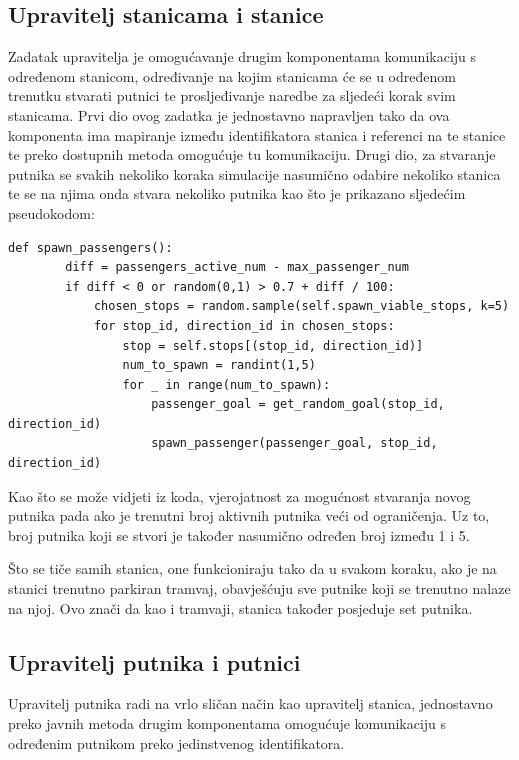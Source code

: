 \documentclass[times, utf8, diplomski]{fer}
\begin{document}
\subsection{Upravitelj stanicama i stanice}
Zadatak upravitelja je omogućavanje drugim komponentama komunikaciju s određenom stanicom, određivanje na kojim stanicama će se u određenom trenutku stvarati putnici te prosljeđivanje naredbe za sljedeći korak svim stanicama. Prvi dio ovog zadatka je jednostavno napravljen tako da ova komponenta ima mapiranje između identifikatora stanica i referenci na te stanice te preko dostupnih metoda omogućuje tu komunikaciju. Drugi dio, za stvaranje putnika se svakih nekoliko koraka simulacije nasumično odabire nekoliko stanica te se na njima onda stvara nekoliko putnika kao što je prikazano sljedećim pseudokodom:

\begin{lstlisting}[caption={Stvaranje novih putnika},captionpos=b,label={kod:passenger_spawn}]
    def spawn_passengers():
        diff = passengers_active_num - max_passenger_num
        if diff < 0 or random(0,1) > 0.7 + diff / 100:
            chosen_stops = random.sample(self.spawn_viable_stops, k=5)
            for stop_id, direction_id in chosen_stops:
                stop = self.stops[(stop_id, direction_id)]
                num_to_spawn = randint(1,5)
                for _ in range(num_to_spawn):
                    passenger_goal = get_random_goal(stop_id, direction_id)
                    spawn_passenger(passenger_goal, stop_id, direction_id)

\end{lstlisting}

Kao što se može vidjeti iz koda, vjerojatnost za mogućnost stvaranja novog putnika pada ako je trenutni broj aktivnih putnika veći od ograničenja. Uz to, broj putnika koji se stvori je također nasumično određen broj između 1 i 5.

Što se tiče samih stanica, one funkcioniraju tako da u svakom koraku, ako je na stanici trenutno parkiran tramvaj, obavješćuju sve putnike koji se trenutno nalaze na njoj. Ovo znači da kao i tramvaji, stanica također posjeduje set putnika.


\subsection{Upravitelj putnika i putnici}
Upravitelj putnika radi na vrlo sličan način kao upravitelj stanica, jednostavno preko javnih metoda drugim komponentama omogućuje komunikaciju s određenim putnikom preko jedinstvenog identifikatora.
\end{document}
